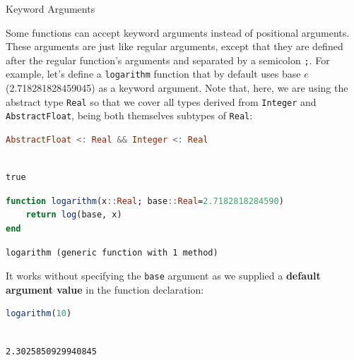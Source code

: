 \documentclass[
  notoc %
]{tufte-book}
\makeatletter
\newcommand{\passthrough}[1]{#1}
\renewcommand\subsubsection{%
\@startsection{subsubsection}{3}{\z@ }{-3.25ex\@plus -1ex \@minus -.2ex}{1.5ex \@plus .2ex}{\normalfont \normalsize \bfseries }
}
\makeatother
\begin{document}
\hypertarget{sec:function_keyword_arguments}{%
\subsubsection{Keyword Arguments}\label{sec:function_keyword_arguments}}

Some functions can accept keyword arguments instead of positional
arguments. These arguments are just like regular arguments, except that
they are defined after the regular function's arguments and separated by
a semicolon \passthrough{\lstinline!;!}. For example, let's define a
\passthrough{\lstinline!logarithm!} function that by default uses base
\(e\) (2.718281828459045) as a keyword argument. Note that, here, we are
using the abstract type \passthrough{\lstinline!Real!} so that we cover
all types derived from \passthrough{\lstinline!Integer!} and
\passthrough{\lstinline!AbstractFloat!}, being both themselves subtypes
of \passthrough{\lstinline!Real!}:

\begin{lstlisting}[language=Julia]
AbstractFloat <: Real && Integer <: Real
\end{lstlisting}

\begin{lstlisting}[language=Output]

true

\end{lstlisting}

\begin{lstlisting}[language=Julia]
function logarithm(x::Real; base::Real=2.7182818284590)
    return log(base, x)
end
\end{lstlisting}

\begin{lstlisting}[language=Output]
logarithm (generic function with 1 method)
\end{lstlisting}

It works without specifying the \passthrough{\lstinline!base!} argument
as we supplied a \textbf{default argument value} in the function
declaration:

\begin{lstlisting}[language=Julia]
logarithm(10)
\end{lstlisting}

\begin{lstlisting}[language=Output]

2.3025850929940845

\end{lstlisting}
\end{document}

